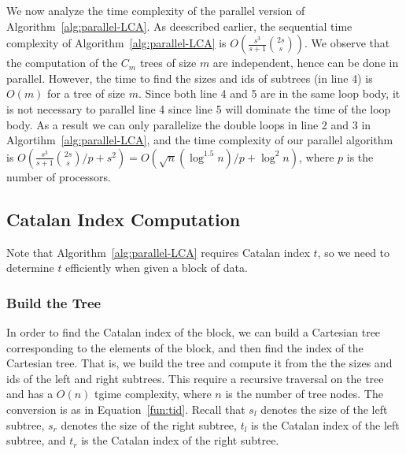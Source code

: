 We now analyze the time complexity of the parallel version of
Algorithm~\ref{alg:parallel-LCA}.  As deescribed earlier, the
sequential time complexity of Algorithm~\ref{alg:parallel-LCA} is
$O(\frac{s^3}{s+1} \binom{2s}{s})$.  We observe that the computation
of the $C_m$ trees of size $m$ are independent, hence can be done in
parallel.  However, the time to find the sizes and ids of subtrees (in
line 4) is $O(m)$ for a tree of size $m$.  Since both line 4 and 5 are
in the same loop body, it is not necessary to parallel line 4 since
line 5 will dominate the time of the loop body.  As a result we can
only parallelize the double loops in line 2 and 3 in
Algortihm~\ref{alg:parallel-LCA}, and the time complexity of our
parallel algorithm is $O(\frac{s^3}{s+1} \binom{2s}{s} / p + s^2) =
O(\sqrt{n} (\log ^{1.5} n) / p + \log^2 n )$, where $p$ is the number
of processors.



\subsection{Catalan Index Computation}

Note that Algorithm~\ref{alg:parallel-LCA} requires Catalan index $t$,
so we need to determine $t$ efficiently when given a block of data.


\subsubsection{Build the Tree}

In order to find the Catalan index of the block, we can build a
Cartesian tree corresponding to the elements of the block, and then
find the index of the Cartesian tree.  That is, we build the tree and
compute it from the the sizes and ids of the left and right subtrees.
This require a recursive traversal on the tree and has a $O(n)$ tgime
complexity, where $n$ is the number of tree nodes.  The conversion is
as in Equation~\ref{fun:tid}.  Recall that $s_l$ denotes the size of
the left subtree, $s_r$ denotes the size of the right subtree, $t_l$
is the Catalan index of the left subtree, and $t_r$ is the Catalan
index of the right subtree.


